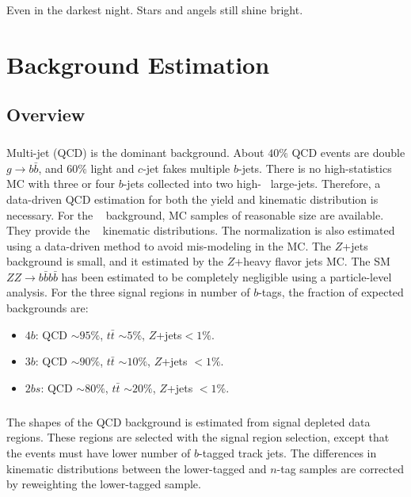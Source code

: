 \begin{savequote}[75mm]
Even in the darkest night. Stars and angels still shine bright.   
\end{savequote}


\chapter{Background Estimation}

\section{Overview}
\paragraph{}
Multi-jet (QCD) is the dominant background. 
About $40\%$ QCD events are double $g \to b\bar{b}$, and $60\%$ light and $c$-jet fakes multiple $b$-jets.
There is no high-statistics MC with three or four $b$-jets collected into two high-\pt~ large-\R jets.
Therefore, a data-driven QCD estimation for both the yield and kinematic distribution is necessary.
For the \ttbar~ background, MC samples of reasonable size are available. 
They provide the \ttbar~ kinematic distributions.
The normalization is also estimated using a data-driven method to avoid mis-modeling in the MC.
The $Z$+jets background is small, and it estimated by the $Z$+heavy flavor jets MC.
The SM $ZZ\to b\bar{b}b\bar{b}$ has been estimated to be completely negligible using a particle-level analysis.
For the three signal regions in number of $b$-tags, the fraction of expected backgrounds are:
\begin{itemize}
	\item $4b$: QCD $\sim 95\%$, $t\bar{t}$ $\sim 5\%$, $Z$+jets$< 1\%$. 
	\item $3b$: QCD $\sim 90\%$, $t\bar{t}$ $\sim 10\%$, $Z$+jets $< 1\%$.  
	\item $2bs$: QCD $\sim 80\%$, $t\bar{t}$ $\sim 20\%$, $Z$+jets $< 1\%$.
\end{itemize}

\paragraph{}
The shapes of the QCD background is estimated from signal depleted data regions. 
These regions are selected with the signal region selection, except that the events must have lower number of $b$-tagged track jets.
The differences in kinematic distributions between the lower-tagged and $n$-tag samples are corrected by reweighting the lower-tagged sample.

